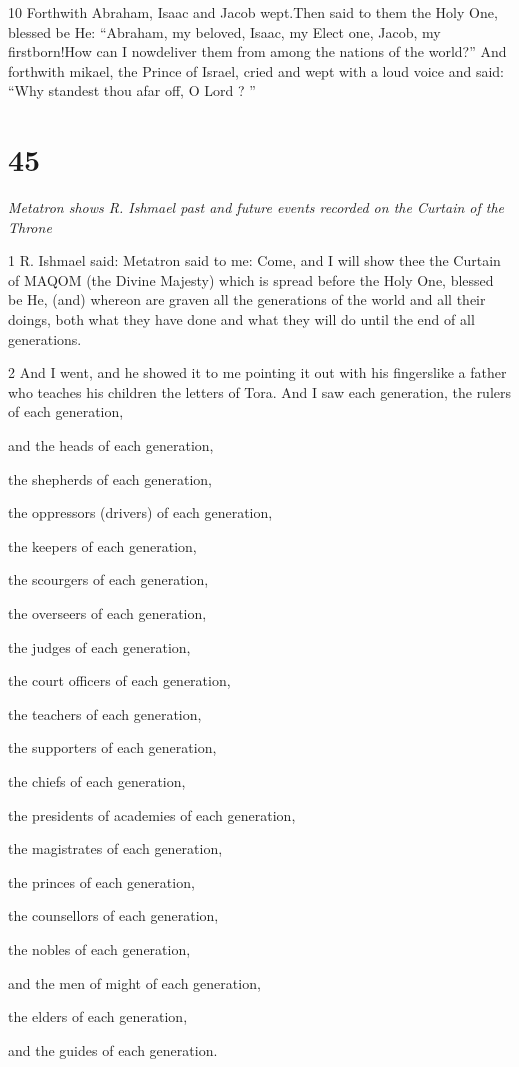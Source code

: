 \par 10 Forthwith Abraham, Isaac and Jacob wept.Then said to them the Holy One, blessed be He: “Abraham, my beloved, Isaac, my Elect one, Jacob, my firstborn!How can I nowdeliver them from among the nations of the world?” And forthwith mikael, the Prince of Israel, cried and wept with a loud voice and said: “Why standest thou afar off, O Lord ? ” 


\chapter{45}

\par \textit{Metatron shows R. Ishmael past and future events recorded on the Curtain of the Throne}

\par 1 R. Ishmael said: Metatron said to me: Come, and I will show thee the Curtain of MAQOM (the Divine Majesty) which is spread before the Holy One, blessed be He, (and) whereon are graven all the generations of the world and all their doings, both what they have done and what they will do until the end of all generations. 

\par 2 And I went, and he showed it to me pointing it out with his fingerslike a father who teaches his children the letters of Tora. And I saw each generation, the rulers of each generation, 
\par and the heads of each generation, 
\par the shepherds of each generation, 
\par the oppressors (drivers) of each generation, 
\par the keepers of each generation, 
\par the scourgers of each generation,
\par the overseers of each generation, 
\par the judges of each generation, 
\par the court officers of each generation, 
\par the teachers of each generation, 
\par the supporters of each generation, 
\par the chiefs of each generation,
\par the presidents of academies of each generation, 
\par the magistrates of each generation, 
\par the princes of each generation, 
\par the counsellors of each generation,
\par the nobles of each generation, 
\par and the men of might of each generation,
\par the elders of each generation, 
\par and the guides of each generation. 

